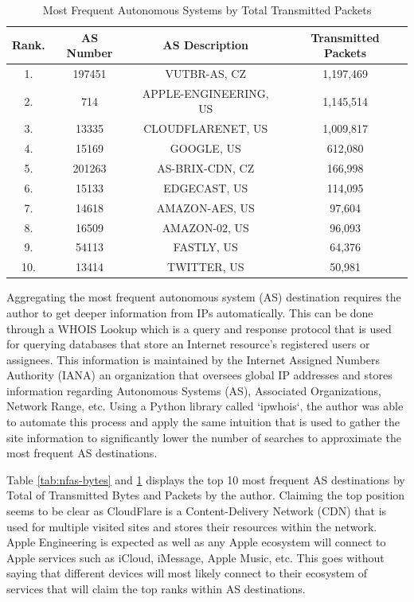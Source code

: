\documentclass{article}
\begin{document}
\begin{table}[H]
    \centering
    \begin{tabular}{cccc}
         Rank. & AS Number & AS Description & Transmitted Packets\\
         \hline
         1. & 197451 & VUTBR-AS, CZ & 1,197,469 \\
         2. & 714 & APPLE-ENGINEERING, US & 1,145,514 \\
         3. & 13335 & CLOUDFLARENET, US & 1,009,817 \\
         4. & 15169 & GOOGLE, US & 612,080 \\
         5. & 201263 & AS-BRIX-CDN, CZ & 166,998 \\
         6. & 15133 & EDGECAST, US & 114,095 \\
         7. & 14618 & AMAZON-AES, US & 97,604 \\
         8. & 16509 & AMAZON-02, US & 96,093 \\
         9. & 54113 & FASTLY, US & 64,376 \\
         10. & 13414 & TWITTER, US & 50,981 \\
    \end{tabular}
    \caption{Most Frequent Autonomous Systems by Total Transmitted Packets}
    \label{tab:nfas-packets}
\end{table}

Aggregating the most frequent autonomous system (AS) destination requires the author to get deeper information from IPs automatically. This can be done through a WHOIS Lookup which is a query and response protocol that is used for querying databases that store an Internet resource's registered users or assignees. This information is maintained by the Internet Assigned Numbers Authority (IANA) an organization that oversees global IP addresses and stores information regarding Autonomous Systems (AS), Associated Organizations, Network Range, etc. Using a Python library called `ipwhois`, the author was able to automate this process and apply the same intuition that is used to gather the site information to significantly lower the number of searches to approximate the most frequent AS destinations.

Table \ref{tab:nfas-bytes} and \ref{tab:nfas-packets} displays the top 10 most frequent AS destinations by Total of Transmitted Bytes and Packets by the author. Claiming the top position seems to be clear as CloudFlare is a Content-Delivery Network (CDN) that is used for multiple visited sites and stores their resources within the network. Apple Engineering is expected as well as any Apple ecosystem will connect to Apple services such as iCloud, iMessage, Apple Music, etc. This goes without saying that different devices will most likely connect to their ecosystem of services that will claim the top ranks within AS destinations.
\end{document}

